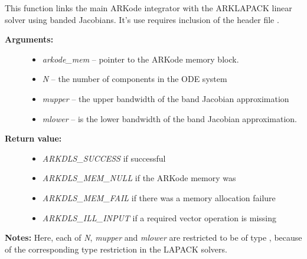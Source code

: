 \documentclass[letterpaper,10pt,english]{sphinxmanual}
\begin{document}

\begin{fulllineitems}
\label{c_interface/User_callable:c.ARKLapackBand}
This function links the main ARKode integrator with the ARKLAPACK
linear solver using banded Jacobians.  It's use requires inclusion
of the header file .
\begin{description}
\item[{\textbf{Arguments:}}] \leavevmode\begin{itemize}
\item {} 
\emph{arkode\_mem} -- pointer to the ARKode memory block.

\item {} 
\emph{N} -- the number of components in the ODE system

\item {} 
\emph{mupper} -- the upper bandwidth of the band Jacobian approximation

\item {} 
\emph{mlower} -- is the lower bandwidth of the band Jacobian approximation.

\end{itemize}

\item[{\textbf{Return value:}}] \leavevmode\begin{itemize}
\item {} 
\emph{ARKDLS\_SUCCESS}   if successful

\item {} 
\emph{ARKDLS\_MEM\_NULL}  if the ARKode memory was 

\item {} 
\emph{ARKDLS\_MEM\_FAIL}  if there was a memory allocation failure

\item {} 
\emph{ARKDLS\_ILL\_INPUT} if a required vector operation is missing

\end{itemize}

\end{description}

\textbf{Notes:} Here, each of \emph{N}, \emph{mupper} and \emph{mlower} are restricted
to be of type , because of the corresponding type restriction
in the LAPACK solvers.

\end{fulllineitems}
\end{document}
